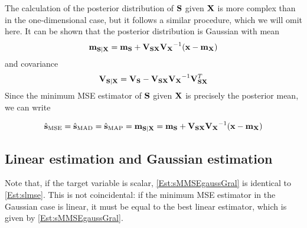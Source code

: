 {The calculation of the posterior distribution of ${\bf S}$ given ${\bf X}$ is more complex than in the one-dimensional case, but it follows a similar procedure, which we will omit here. It can be shown that the posterior distribution is Gaussian with mean
\begin{align}
{\bf m}_{{\bf S}|{\bf X}} 
      = {\bf m}_{\bf S} + {\bf V}_{\bf SX}{\bf V_X}^{-1}({\bf x}-{\bf m}_{\bf X}) 
\label{Est:sMMSEgaussMN}
\end{align}
and covariance
\begin{align}
{\bf V}_{{\bf S}|{\bf X}} 
      = {\bf V_S}- {\bf V}_{\bf SX}{\bf V_X}^{-1}{\bf V}_{\bf SX}^T
\end{align}
Since the minimum MSE estimator of ${\bf S}$ given ${\bf X}$ is precisely the posterior mean, we can write
\begin{framed}
\begin{align}
\hat{\bf s}_{\text{MSE}} = \hat{\bf s}_{\text{MAD}} = \hat{\bf s}_{\text{MAP}} = 
{\bf m}_{{\bf S}|{\bf X}} = {\bf m}_{\bf S} + {\bf V}_{\bf SX}{\bf V_X}^{-1}({\bf x}-{\bf m}_{\bf X}) 
\label{Est:sMMSEgaussGral}
\end{align}
\end{framed}

\subsection{Linear estimation and Gaussian estimation}

{Note that, if the target variable is scalar, \eqref{Est:sMMSEgaussGral} is identical to \eqref{Est:slmse}. This is not coincidental: if the minimum MSE estimator in the Gaussian case is linear, it must be equal to the best linear estimator, which is given by \eqref{Est:sMMSEgaussGral}.}

}
